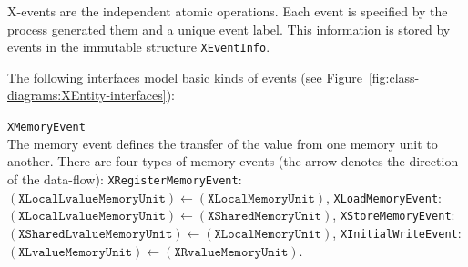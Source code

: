X-events are the independent atomic operations.
Each event is specified by the process generated them and a unique event label.
This information is stored by events in the immutable structure \texttt{XEventInfo}.

The following interfaces model basic kinds of events (see Figure~\ref{fig:class-diagrams:XEntity-interfaces}):
\begin{outline}
  \1 \texttt{XMemoryEvent} \\
  The memory event defines the transfer of the value from one memory unit to another.
  There are four types of memory events (the arrow denotes the direction of the data-flow):
  \2 \texttt{XRegisterMemoryEvent}: \\
    $(\texttt{XLocalLvalueMemoryUnit}) \leftarrow (\texttt{XLocalMemoryUnit})$,
  \2 \texttt{XLoadMemoryEvent}: \\
    $(\texttt{XLocalLvalueMemoryUnit}) \leftarrow (\texttt{XSharedMemoryUnit})$,
  \2 \texttt{XStoreMemoryEvent}: \\
    $(\texttt{XSharedLvalueMemoryUnit}) \leftarrow (\texttt{XLocalMemoryUnit})$,
  \2 \texttt{XInitialWriteEvent}: \\
    $(\texttt{XLvalueMemoryUnit}) \leftarrow (\texttt{XRvalueMemoryUnit})$.

  

\end{outline}
